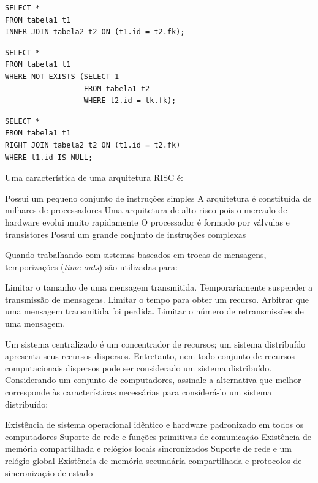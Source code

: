 \documentclass[12pt, addpoints]{exam}
\begin{document}
\begin{questions}
\begin{choices}
\choice \begin{verbatim}SELECT *
FROM tabela1 t1
INNER JOIN tabela2 t2 ON (t1.id = t2.fk);
\end{verbatim}

\choice \begin{verbatim}SELECT *
FROM tabela1 t1
WHERE NOT EXISTS (SELECT 1
                  FROM tabela1 t2
                  WHERE t2.id = tk.fk);
\end{verbatim}

\choice \begin{verbatim}SELECT *
FROM tabela1 t1
RIGHT JOIN tabela2 t2 ON (t1.id = t2.fk)
WHERE t1.id IS NULL;
\end{verbatim}

\end{choices}

\question
Uma característica de uma arquitetura RISC é:
\begin{choices}
\choice Possui um pequeno conjunto de instruções simples
\choice A arquitetura é constituída de milhares de processadores
\choice Uma arquitetura de alto risco pois o mercado de hardware evolui muito rapidamente
\choice O processador é formado por válvulas e transistores
\choice Possui um grande conjunto de instruções complexas
\end{choices}

\question
Quando trabalhando com sistemas baseados em trocas de mensagens, temporizações (\textit{time-outs}) são utilizadas para:

\begin{choices}
\choice Limitar o tamanho de uma mensagem transmitida.
\choice Temporariamente suspender a transmissão de mensagens.
\choice Limitar o tempo para obter um recurso.
\choice Arbitrar que uma mensagem transmitida foi perdida.
\choice Limitar o número de retransmissões de uma mensagem.
\end{choices}

\question
Um sistema centralizado é um concentrador de recursos; um sistema distribuído apresenta seus recursos dispersos. Entretanto, nem todo conjunto de recursos computacionais dispersos pode ser considerado um sistema distribuído. Considerando um conjunto de computadores, assinale a alternativa que melhor corresponde às características necessárias para considerá-lo um sistema distribuído:
\begin{choices}
\choice Existência de sistema operacional idêntico e hardware padronizado em todos os computadores
\choice Suporte de rede e funções primitivas de comunicação 
\choice Existência de memória compartilhada e relógios locais sincronizados 
\choice Suporte de rede e um relógio global
\choice Existência de memória secundária compartilhada e protocolos de sincronização de estado
\end{choices}



    \end{questions}
    
\end{document}
